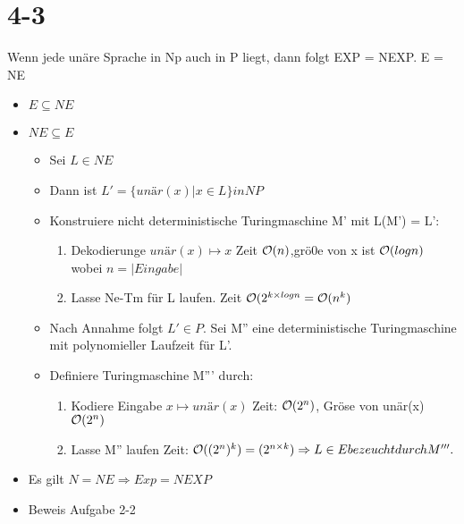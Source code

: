 \documentclass[12pt, oneside, a4paper, numbers=enddot, abstracton, parskip=full]{scrreprt}
\begin{document}
\section{4-3}
Wenn jede unäre Sprache in Np auch in P liegt, dann folgt EXP =
NEXP. E = NE

\begin{itemize}
\item $E\subseteq NE$
\item $NE \subseteq E$
  \begin{itemize}
  \item Sei $L \in NE$
  \item Dann ist $L' =\{unär(x) | x\in L\} in NP $
  \item Konstruiere nicht deterministische Turingmaschine M' mit L(M') = L':
  \begin{enumerate}
  \item Dekodierunge $unär(x) \mapsto x $ Zeit $\mathcal{O} (n)$,grö0e von x
    ist $ \mathcal{O} (log n) $ wobei $ n=|Eingabe|$
  \item Lasse Ne-Tm  für L laufen. Zeit $ \mathcal{O} (2^{k \times log n} = \mathcal{O} (n^k)$

  \end{enumerate}
  \item Nach Annahme folgt $L' \in P$. Sei M'' eine deterministische
    Turingmaschine mit polynomieller Laufzeit für L'.
  \item Definiere Turingmaschine M''' durch:
    \begin{enumerate}
    \item Kodiere Eingabe $x \mapsto unär(x)$  Zeit: $ \mathcal{O} (2^n)$,
      Gröse von unär(x) $ \mathcal{O} (2^n)$
    \item Lasse M'' laufen Zeit: $ \mathcal{O} ((2^n)^k) = (2^{n \times k})
      \Rightarrow L \in E bezeucht durch M'''.$
    \end{enumerate}
  \end{itemize}
\item Es gilt $N=NE \Rightarrow Exp = NEXP$
\item Beweis Aufgabe 2-2
\end{itemize}
\end{document}
